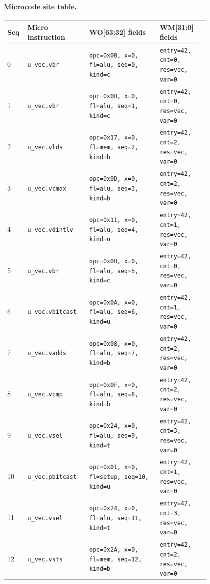\paragraph{Microcode site table.}
{\scriptsize
\begin{longtable}{@{}R{0.055\linewidth}L{0.23\linewidth}L{0.31\linewidth}L{0.22\linewidth}@{}}
\toprule
Seq & Micro instruction & WO[63:32] fields & WM[31:0] fields \\
 & \texttt{u\_vec.vbr} & \texttt{opc=0x0B, x=0, fl=alu, seq=0, kind=c} & \texttt{entry=42, cnt=0, res=vec, var=0} \\
1 & \texttt{u\_vec.vbr} & \texttt{opc=0x0B, x=0, fl=alu, seq=1, kind=c} & \texttt{entry=42, cnt=0, res=vec, var=0} \\
2 & \texttt{u\_vec.vlds} & \texttt{opc=0x17, x=0, fl=mem, seq=2, kind=b} & \texttt{entry=42, cnt=2, res=vec, var=0} \\
3 & \texttt{u\_vec.vcmax} & \texttt{opc=0x0D, x=0, fl=alu, seq=3, kind=b} & \texttt{entry=42, cnt=2, res=vec, var=0} \\
4 & \texttt{u\_vec.vdintlv} & \texttt{opc=0x11, x=0, fl=alu, seq=4, kind=u} & \texttt{entry=42, cnt=1, res=vec, var=0} \\
5 & \texttt{u\_vec.vbr} & \texttt{opc=0x0B, x=0, fl=alu, seq=5, kind=c} & \texttt{entry=42, cnt=0, res=vec, var=0} \\
6 & \texttt{u\_vec.vbitcast} & \texttt{opc=0x0A, x=0, fl=alu, seq=6, kind=u} & \texttt{entry=42, cnt=1, res=vec, var=0} \\
7 & \texttt{u\_vec.vadds} & \texttt{opc=0x08, x=0, fl=alu, seq=7, kind=b} & \texttt{entry=42, cnt=2, res=vec, var=0} \\
8 & \texttt{u\_vec.vcmp} & \texttt{opc=0x0F, x=0, fl=alu, seq=8, kind=b} & \texttt{entry=42, cnt=2, res=vec, var=0} \\
9 & \texttt{u\_vec.vsel} & \texttt{opc=0x24, x=0, fl=alu, seq=9, kind=t} & \texttt{entry=42, cnt=3, res=vec, var=0} \\
10 & \texttt{u\_vec.pbitcast} & \texttt{opc=0x01, x=0, fl=setup, seq=10, kind=u} & \texttt{entry=42, cnt=1, res=vec, var=0} \\
11 & \texttt{u\_vec.vsel} & \texttt{opc=0x24, x=0, fl=alu, seq=11, kind=t} & \texttt{entry=42, cnt=3, res=vec, var=0} \\
12 & \texttt{u\_vec.vsts} & \texttt{opc=0x2A, x=0, fl=mem, seq=12, kind=b} & \texttt{entry=42, cnt=2, res=vec, var=0} \\
\bottomrule
\end{longtable}
}
